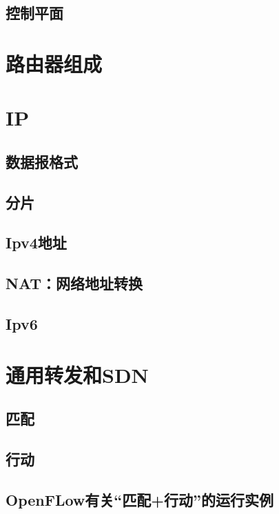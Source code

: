 \documentclass[]{report}
\begin{document}
		\subsection{控制平面}
	\section{路由器组成}
	\section{IP}
		\subsection{数据报格式}
		\subsection{分片}
		\subsection{Ipv4地址}
		\subsection{NAT：网络地址转换}
		\subsection{Ipv6}
	\section{通用转发和SDN}
		\subsection{匹配}
		\subsection{行动}
		\subsection{OpenFLow有关“匹配+行动”的运行实例}
\end{document}
